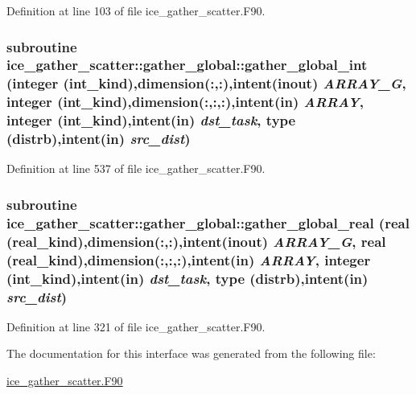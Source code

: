 Definition at line 103 of file ice\_\-gather\_\-scatter.F90.\hypertarget{interfaceice__gather__scatter_1_1gather__global_a37d71c277551534bbef6485810e646dc}{
\subsubsection[{gather\_\-global\_\-int}]{\setlength{\rightskip}{0pt plus 5cm}subroutine ice\_\-gather\_\-scatter::gather\_\-global::gather\_\-global\_\-int (integer (int\_\-kind),dimension(:,:),intent(inout) {\em ARRAY\_\-G}, \/  integer (int\_\-kind),dimension(:,:,:),intent(in) {\em ARRAY}, \/  integer (int\_\-kind),intent(in) {\em dst\_\-task}, \/  type ({\bf distrb}),intent(in) {\em src\_\-dist})}}
\label{interfaceice__gather__scatter_1_1gather__global_a37d71c277551534bbef6485810e646dc}


Definition at line 537 of file ice\_\-gather\_\-scatter.F90.\hypertarget{interfaceice__gather__scatter_1_1gather__global_a8f22e460e948c057cc341222a0224a5f}{
\subsubsection[{gather\_\-global\_\-real}]{\setlength{\rightskip}{0pt plus 5cm}subroutine ice\_\-gather\_\-scatter::gather\_\-global::gather\_\-global\_\-real (real (real\_\-kind),dimension(:,:),intent(inout) {\em ARRAY\_\-G}, \/  real (real\_\-kind),dimension(:,:,:),intent(in) {\em ARRAY}, \/  integer (int\_\-kind),intent(in) {\em dst\_\-task}, \/  type ({\bf distrb}),intent(in) {\em src\_\-dist})}}
\label{interfaceice__gather__scatter_1_1gather__global_a8f22e460e948c057cc341222a0224a5f}


Definition at line 321 of file ice\_\-gather\_\-scatter.F90.

The documentation for this interface was generated from the following file:\begin{DoxyCompactItemize}
\item 
\hyperlink{ice__gather__scatter_8F90}{ice\_\-gather\_\-scatter.F90}\end{DoxyCompactItemize}
